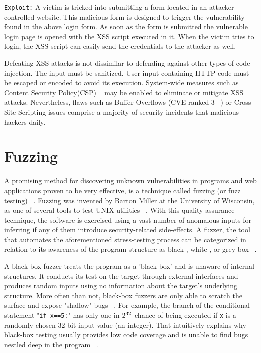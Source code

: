 {\tt Exploit:} A victim is tricked into submitting a form located in an attacker-controlled website. This malicious form is designed to trigger the vulnerability found in the above login form. As soon as the form is submitted the vulnerable login page is opened with the XSS script executed in it. When the victim tries to login, the XSS script can easily send the credentials to the attacker as well. 

Defeating XSS attacks is not dissimilar to defending against other types of code injection.
The input must be sanitized. User input containing HTTP code must be escaped or encoded to avoid its execution. System-wide measures such as Content Security Policy(CSP) ~\cite{csp_def} may be enabled to eliminate or mitigate XSS attacks. Nevertheless, flaws such as Buffer Overflows (CVE ranked 3 ~\cite{cve}) or Cross-Site Scripting issues comprise a majority of security incidents that malicious hackers daily. 

\section{Fuzzing}
A promising method for discovering unknown vulnerabilities in programs and web applications proven to be very effective, is a technique called fuzzing (or fuzz testing) ~\cite{fuzzing_def}. Fuzzing was invented by Barton Miller at the University of Wisconsin, as one of several tools to test UNIX utilities ~\cite{mller1990fuzz}. With this quality assurance technique, the software is exercised using a vast number of anomalous inputs for inferring if any of them introduce security-related side-effects. A fuzzer, the tool that automates the aforementioned stress-testing process can be categorized in relation to its awareness of the program structure as black-, white-, or grey-box ~\cite{fuzzing_book}. 

A black-box fuzzer treats the program as a 'black box' and is unaware of internal structures. It conducts its test on the target through external interfaces and produces random inputs using no information about the target's underlying structure. More often than not, black-box fuzzers are only able to scratch the surface and expose "shallow" bugs ~\cite{fuzzing_owasp}. For example, the branch of the conditional statement "{\tt if x==5:}" has only one in $2\textsuperscript{32}$ chance of being executed if {\tt x} is a randomly chosen 32-bit input value (\ie an integer). That intuitively explains why black-box testing usually provides low code coverage and is unable to find bugs nestled deep in the program ~\cite{Godefroid2008AutomatedWF}.

